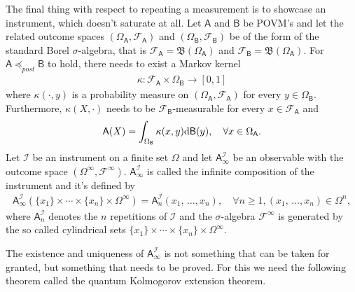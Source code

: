 \documentclass[a4paper,12pt]{wihuri}
\theoremstyle{definition}
\numberwithin{definition}{section}
\numberwithin{example}{section}
\numberwithin{theorem}{section}
\numberwithin{proposition}{section}
\numberwithin{lemma}{section}
\newcommand{\I}{\mathcal{I}}%
\newcommand{\salg}{\mathcal{F}}%
\newcommand{\borel}{\mathfrak{B}}
\newcommand{\A}{\mathsf{A}}%
\newcommand{\B}{\mathsf{B}}%
\newcommand{\pp}{\preceq_{post}}
\begin{document}
The final thing with respect to repeating a measurement is to showcase an instrument, which doesn't saturate at all. Let $\A$ and $\B$ be POVM's and let the related outcome spaces $(\Omega_\A, \salg_\A)$ and $(\Omega_\B, \salg_\B)$ be of the form of the standard Borel $\sigma$-algebra, that is $\salg_\A = \borel(\Omega_\A)$ and $\salg_\B = \borel(\Omega_\A)$. For $\A \pp \B$ to hold, there needs to exist a Markov kernel
\begin{align*}
\kappa: \salg_\A \times \Omega_\B \rightarrow [0,1]
\end{align*}
where $\kappa(\cdot, y)$ is a probability measure on $(\Omega_\A, \salg_\A)$ for every $y \in \Omega_\B$. Furthermore, $\kappa(X, \cdot)$ needs to be $\salg_\B$-measurable for every $x \in \salg_\A$ and
\begin{align*}
\A(X) = \int_{\Omega_\B}\kappa(x,y)\text{d}\B(y), \quad \forall x \in \Omega_\A\text.
\end{align*}
Let $\I$ be an instrument on a finite set $\Omega$ and let $\A_{\infty}^\I$ be an observable with the outcome space $(\Omega^{\infty}, \salg^{\infty})$. $\A_{\infty}^\I$ is called the infinite composition of the instrument and it's defined by
\begin{align*}
\A_{\infty}^\I(\{x_1\} \times \cdots \times \{x_n\} \times \Omega^{\infty}) = \A_n^\I(x_1,\,\ldots,x_n), \quad \forall n \geq 1, (x_1,\,\ldots,x_n) \in \Omega^n,
\end{align*}
where $\A_n^\I$ denotes the $n$ repetitions of $\I$ and the $\sigma$-algebra $\salg^{\infty}$ is generated by the so called cylindrical sets $\{x_1\} \times \cdots \times \{x_n\} \times \Omega^{\infty}$. 

The existence and uniqueness of $\A_{\infty}^\I$ is not something that can be taken for granted, but something that needs to be proved. For this we need the following theorem called the quantum Kolmogorov extension theorem\cite{kuramochi_constrution}\cite{Tumulka2008_kolmogorov}.

\end{document}
